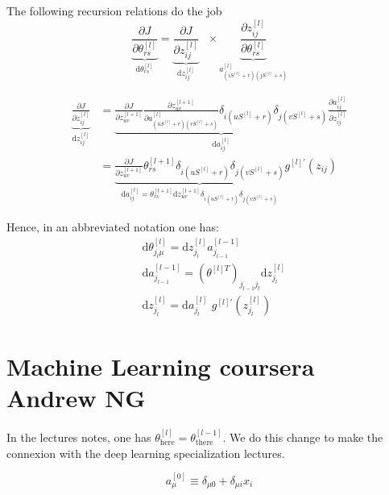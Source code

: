 \documentclass[a4paper,11pt]{article}
\newcommand{\dd}{\text{d}}
\newcommand{\na}[2]{a_{#1}^{[#2]}}
\newcommand{\nz}[2]{z_{#1}^{[#2]}}
\newcommand{\nt}[3]{\theta_{#1 #2}^{[#3]}}
\begin{document}
The following recursion relations do the job
\begin{equation}
    \underbrace{
    \frac{\partial J }{\partial  \nt{r}{s}{l}  }
    }_{\dd  \nt{r}{s}{l} } 
   =
   \underbrace{
    \frac{\partial J  }{\partial \nz{ij}{l} }
    }_{\dd  \nz{ij }{l} }\,\,\,\,  \times
    \underbrace{
    \frac{\partial \nz{ij}{l} }{\partial \nt{r}{s}{l}  }
    }_{ \na{(iS^{[l]}+r)(jS^{[l]}+s)}{l} }
\end{equation}


\begin{align}
\underbrace{
\frac{\partial J  }{\partial \nz{ij }{l}   }
}_{\dd  \nz{ij }{l} }
	&=
	\underbrace{ 
	\frac{\partial J  }{\partial \nz{uv}{l+1}   } 
	\frac{\partial \nz{uv}{l+1}   }{ \partial \na{ (uS^{[l]} +r )(vS^{[l]}+s)}{l}  }
	\delta_{i (uS^{[l]} +r )} \delta_{j (vS^{[l]} +s )}
	}_{\dd a_{ij}^{[l]} }
	\frac{\partial \na{ij}{l}    }{ \partial \nz{ij}{l}  }
	\\
	&=
	\underbrace{
	\frac{\partial J  }{\partial \nz{ uv  }{l+1}   } 
	 \nt{r}{s}{l+1}
	 \delta_{i (uS^{[l]} +r )} \delta_{j (vS^{[l]} +s )}
	 }_{\dd a_{ij}^{[l]}
	 =\theta^{[l+1]}_{ rs} \dd z_{uv}^{[l+1]} 
	  \delta_{i (uS^{[l]} +r )} \delta_{j (vS^{[l]} +s )}
	 } 
	 g^{[l]'}\left( z_{ij}   \right) 
\end{align}

Hence, in an abbreviated notation one has:
\begin{eqnarray}
	&\dd  \nt{j_l}{\mu}{l} = \dd  \nz{j_{l}}{l}  \na{j_{l-1}}{l-1}\\
	&\dd a_{j_{l-1}}^{[l-1]}=(\theta^{[l]T})_{j_{l-1} j_{l}} \dd z_{j_{l}}^{[l]}\\
	&\dd  \nz{j_{l}}{l}= \dd a_{j_l}^{[l]} \,\, g^{[l]'}\left( z_{j_{l}}^{[l]}   \right)
\end{eqnarray}



\section{Machine Learning coursera Andrew NG}

In the lectures notes, one has 
$\theta^{[l]}_{\text{here}}=\theta^{[l-1]}_{\text{there}}$.
We do this change to make the connexion with the 
deep learning specialization lectures.

\begin{equation}
    \na{\mu}{0} \equiv \delta_{\mu0}+\delta_{\mu i} x_i %
\end{equation}
\end{document}
